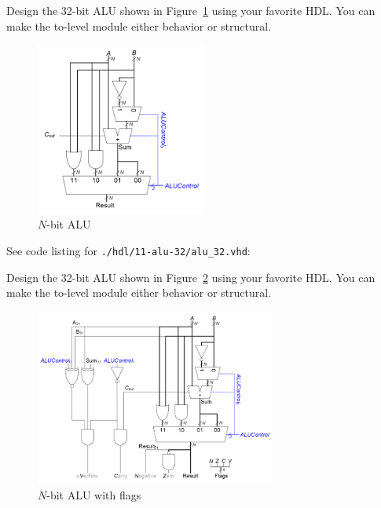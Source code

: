 \documentclass[12pt]{article}
\newenvironment{ex}[2][Exercise]{\begin{trivlist}
		\item[\hskip \labelsep {\bfseries #1}\hskip \labelsep {\bfseries #2.}]}{\end{trivlist}}
\newenvironment{sol}[1][Solution]{\begin{trivlist}
		\item[\hskip \labelsep {\bfseries #1:}]}{\end{trivlist}}
\begin{document}
\begin{ex}{5.11}
	Design the 32-bit ALU shown in Figure~\ref{n-bit-ALU} using your favorite HDL.
	You can make the to-level module either behavior or structural.
	\begin{figure}
		\centering
		\includegraphics[width=0.5\textwidth]{n-bit-ALU}
		\caption{$N$-bit ALU}
		\label{n-bit-ALU}
	\end{figure}
\end{ex}

\begin{sol}
	See code listing for \texttt{./hdl/11-alu-32/alu\_32.vhd}:
	
\end{sol}

\begin{ex}{5.12}
	Design the 32-bit ALU shown in Figure~\ref{n-bit-ALU-flags} using your favorite HDL.
	You can make the to-level module either behavior or structural.
	\begin{figure}
		\centering
		\includegraphics[width=0.7\textwidth]{n-bit-ALU-flags}
		\caption{$N$-bit ALU with flags}
		\label{n-bit-ALU-flags}
	\end{figure}
\end{ex}
\end{document}
